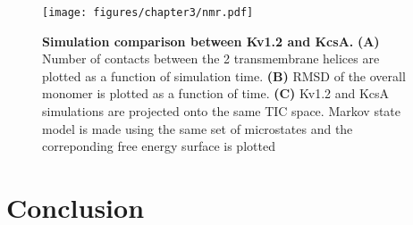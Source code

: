 \begin{figure}[!ht]
\begin{center}
	\texttt{[image: figures/chapter3/nmr.pdf]}
\end{center}
	\caption{\textbf{Simulation comparison between Kv1.2 and KcsA.} \textbf{(A)} Number of contacts between the 2 transmembrane helices are plotted as a function of simulation time. \textbf{(B)} RMSD of the overall monomer is plotted as a function of time. \textbf{(C)} Kv1.2 and KcsA simulations are projected onto the same TIC space. Markov state model is made using the same set of microstates and the correponding free energy surface is plotted}
	\label{fig:ch3_f3}
\end{figure}

\section{Conclusion}

\renewcommand\thefigure{\thechapter.\arabic{figure}} 

